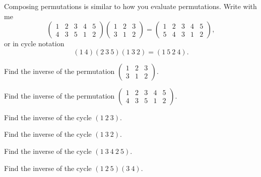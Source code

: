 \documentclass{ximera}
\begin{document}
\begin{example}[Composition]
  Composing permutations is similar to how you evaluate permutations.
  Write with me
  \[
  \left(\begin{smallmatrix}
    1 & 2 & 3 & 4 & 5\\
    4 & 3 & 5 & 1 & 2
  \end{smallmatrix}\right)
  \left(\begin{smallmatrix}
    1 & 2 & 3\\
    3 & 1 & 2
  \end{smallmatrix}\right)
  = \left(\begin{smallmatrix}
    1 & 2 & 3 & 4 & 5\\
    5 & 4 & 3 & 1 & 2
  \end{smallmatrix}\right),
  \]
  or in cycle notation
  \[
  (1\ 4)(2\ 3\ 5)(1\ 3\ 2) = (1\ 5\ 2\ 4).
  \]
\end{example}


\begin{exercise}
  Find the inverse of the permutation $\left(\begin{smallmatrix}
    1 & 2 & 3\\
    3 & 1 & 2
  \end{smallmatrix}\right)$.
\end{exercise}

\begin{exercise}
  Find the inverse of the permutation $\left(\begin{smallmatrix}
    1 & 2 & 3 & 4 & 5\\
    4 & 3 & 5 & 1 & 2
  \end{smallmatrix}\right)$.
\end{exercise}

\begin{exercise}
  Find the inverse of the cycle $(1 \ 2 \ 3 )$.
\end{exercise}

\begin{exercise}
  Find the inverse of the cycle $(1 \ 3 \ 2 )$.
\end{exercise}

\begin{exercise}
  Find the inverse of the cycle $(1\ 3\ 4 \ 2 \ 5 )$.
\end{exercise}


\begin{exercise}
  Find the inverse of the cycle $(1 \ 2 \ 5) (3\ 4)$.
\end{exercise}
\end{document}
